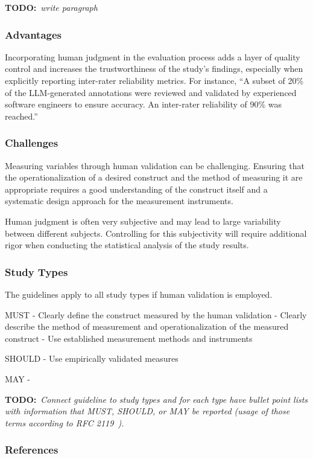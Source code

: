 \documentclass[11pt]{article}
\newcommand{\todo}[1]{{\textbf{TODO:}\ \textit{#1}}} %
\begin{document}
\todo{write paragraph}


\subsubsection{Advantages}

Incorporating human judgment in the evaluation process adds a layer of quality control and increases the trustworthiness of the study’s findings, especially when explicitly reporting inter-rater reliability metrics. For instance, ``A subset of 20\% of the LLM-generated annotations were reviewed and validated by experienced software engineers to ensure accuracy. An inter-rater reliability of 90\% was reached.''


\subsubsection{Challenges}

Measuring variables through human validation can be challenging.
Ensuring that the operationalization of a desired construct and the method of measuring it are appropriate requires a good understanding of the construct itself and a systematic design approach for the measurement instruments.

Human judgment is often very subjective and may lead to large variability between different subjects.
Controlling for this subjectivity will require additional rigor when conducting the statistical analysis of the study results.

\subsubsection{Study Types}

The guidelines apply to all study types if human validation is employed.

MUST
- Clearly define the construct measured by the human validation
- Clearly describe the method of measurement and operationalization of the measured construct
- Use established measurement methods and instruments

SHOULD
- Use empirically validated measures

MAY
- 

\todo{Connect guideline to study types and for each type have bullet point lists with information that MUST, SHOULD, or MAY be reported (usage of those terms according to RFC 2119~\cite{rfc2119}).}


\subsubsection{References}



\end{document}
